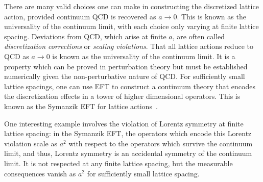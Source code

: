 \documentclass{ar-1col}
\begin{document}
There are many valid choices one can make in constructing the discretized lattice action, provided continuum QCD is recovered as $a\rightarrow0$.
This is known as the universality of the continuum limit, with each choice only varying at finite lattice spacing.
Deviations from QCD, which arise at finite $a$, are often called \textit{discretization corrections} or \textit{scaling violations}.
That all lattice actions reduce to QCD as $a\rightarrow0$ is known as the universality of the continuum limit.  It is a property which can be proved in perturbation theory but must be established numerically given the non-perturbative nature of QCD.  For sufficiently small lattice spacings, one can use EFT to construct a continuum theory that encodes the discretization effects in a tower of higher dimensional operators. This is known as the Symanzik EFT for lattice actions~\cite{Symanzik:1983dc,Symanzik:1983gh}.%
\begin{marginnote}
\end{marginnote}%
One interesting example involves the violation of Lorentz symmetry at finite lattice spacing: in the Symanzik EFT, the operators which encode this Lorentz violation scale as $a^2$ with respect to the operators which survive the continuum limit, and thus, Lorentz symmetry is an accidental symmetry of the continuum limit.  It is not respected at any finite lattice spacing, but the measurable consequences vanish as $a^2$ for sufficiently small lattice spacing.
\end{document}
